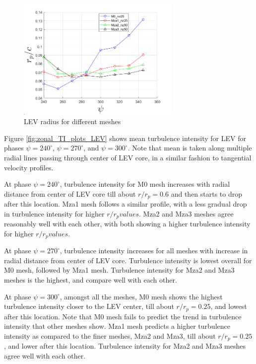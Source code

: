 \begin{figure}[H]
	\centering
	\includegraphics[width=0.7\textwidth]{figures/zonal_adapt_results/LEV/LEV_radius_vp}
	\caption{ LEV radius for different meshes}
	\label{fig:zonal_LEV_radius}
\end{figure}

Figure \ref{fig:zonal_TI_plots_LEV} shows mean turbulence intensity for LEV for phases $\psi = 240^\circ$, $\psi = 270^\circ$, and $\psi = 300^\circ$. 
Note that mean is taken along multiple radial lines passing through center of LEV core, in a similar fashion to tangential velocity profiles.

At phase $\psi = 240^\circ$, turbulence intensity for M0 mesh increases with radial distance from center of LEV core till about $r/r_p = 0.6$ and then starts to drop after this location.
Mza1 mesh follows a similar profile, with a less gradual drop in turbulence intensity for higher $r/r_p values$.
Mza2 and Mza3 meshes agree reasonably well with each other, with both showing a higher turbulence intensity for higher $r/r_p values$.


At phase $\psi = 270^\circ$, turbulence intensity increases for all meshes with increase in radial distance from center of LEV core.
Turbulence intensity is lowest overall for M0 mesh, followed by Mza1 mesh. Turbulence intensity for Mza2 and Mza3 meshes is the highest, and compare well with each other.

At phase $\psi = 300^\circ$, amongst all the meshes, M0 mesh shows the highest turbulence intensity closer to the LEV center, till about $r/r_p = 0.25$, and lowest after this location.
Note that M0 mesh fails to predict the trend in turbulence intensity that other meshes show.
Mza1 mesh predicts a higher turbulence intensity as compared to the finer meshes, Mza2 and Mza3, till about $r/r_p = 0.25$, and lower after this location.
Turbulence intensity for Mza2 and Mza3 meshes agree well with each other. 


